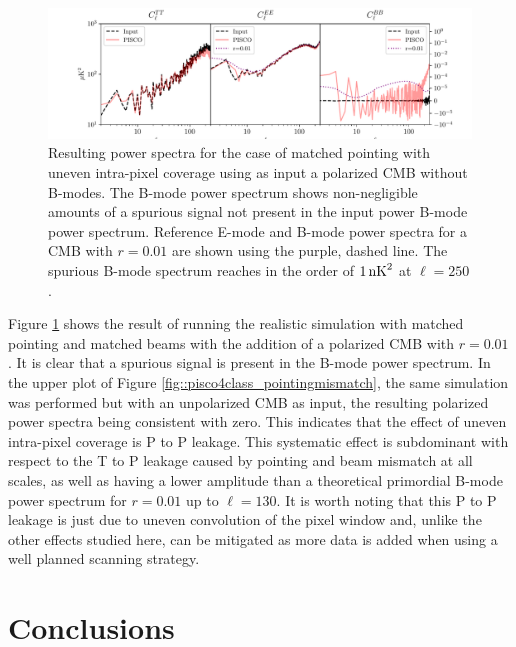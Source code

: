 \documentclass[a4paper,11pt]{article}
\begin{document}
\begin{figure}
	\centering
	\includegraphics[width=1\textwidth]{figures/intrapixel.pdf}
	\caption{Resulting power spectra for the case of matched pointing with uneven intra-pixel coverage using as input a polarized CMB without B-modes. The B-mode power spectrum shows non-negligible amounts of a spurious signal not present in the input power B-mode power spectrum. Reference E-mode and B-mode power spectra for a CMB with $r=0.01$ are shown using the purple, dashed line. The spurious B-mode spectrum reaches in the order of $1\, \rm{nK}^2$ at $\ell = 250$.}
	\label{fig::pisco4class_intrapixel}
\end{figure}

Figure \ref{fig::pisco4class_intrapixel} shows the result of running the realistic simulation with matched pointing and matched beams with the addition of a polarized CMB with $r=0.01$. It is clear that a spurious signal is present in the B-mode power spectrum. In the upper plot of Figure \ref{fig::pisco4class_pointingmismatch}, the same simulation was performed but with an unpolarized CMB as input, the resulting polarized power spectra being consistent with zero. This indicates that the effect of uneven intra-pixel coverage is P to P leakage. This systematic effect is subdominant with respect to the T to P leakage caused by pointing and beam mismatch at all scales, as well as having a lower amplitude than a theoretical primordial B-mode power spectrum for $r=0.01$ up to $\ell=130$. It is worth noting that this P to P leakage is just due to uneven convolution of the pixel window and, unlike the other effects studied here, can be mitigated as more data is added when using a well planned scanning strategy.

\section{Conclusions}
\label{sec::conclusions}
\end{document}
